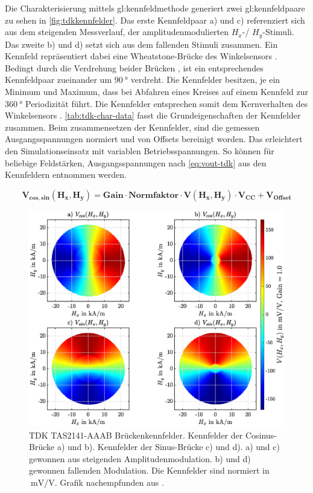 Die Charakterisierung mittels \gls{gl:kennfeldmethode} generiert zwei \gls{gl:kennfeldpaar}e zu sehen in \autoref{fig:tdkkennfelder}. Das erste Kennfeldpaar a) und c) referenziert sich aus dem steigenden Messverlauf, der amplitudenmodulierten $H_x$-/ $H_y$-Stimuli. Das zweite b) und d) setzt sich aus dem fallenden Stimuli zusammen. Ein Kennfeld repräsentiert dabei eine Wheatstone-Brücke des Winkelsensors \cite{Schuethe2019}. Bedingt durch die Verdrehung beider Brücken \cite{TDK2016}, ist ein entsprechendes Kennfeldpaar zueinander um $\SI{90}{\degree}$ verdreht.
Die Kennfelder besitzen, je ein Minimum und Maximum, dass bei Abfahren eines Kreises auf einem Kennfeld zur 
$\SI{360}{\degree}$ Periodizität führt. Die Kennfelder entsprechen somit dem Kernverhalten des Winkelsensors 
\cite{TDK2016}. \autoref{tab:tdk-char-data} fasst die Grundeigenschaften der Kennfelder zusammen. Beim zusammensetzen 
der Kennfelder, sind die gemessen Ausgangsspannungen normiert und von Offsets bereinigt worden. Das erleichtert den 
Simulationseinsatz mit variablen Betriebsspannungen. So können für beliebige Feldstärken, Ausgangsspannungen nach 
\autoref{eq:vout-tdk} aus den Kennfeldern entnommen werden.


\begin{equation}\label{eq:vout-tdk}
	\mathbf{V_{cos,sin}(H_x,H_y) = Gain \cdot Normfaktor \cdot V(H_x,H_y) \cdot V_{CC} + V_{Offset}}
\end{equation}


\begin{figure}[bph]
	\centering
	\includegraphics[width=.95\linewidth]{appendix/images/3-TDK/TDK_Kennfelder}
	\caption[TDK TAS2141-AAAB Brückenkennfelder]{TDK TAS2141-AAAB Brückenkennfelder. Kennfelder der Cosinus-Brücke a) 
		und b). Kennfelder der Sinus-Brücke c) und d). a) und c) gewonnen aus steigenden Amplitudenmodulation. b) und 
		d) gewonnen fallenden Modulation. Die Kennfelder sind normiert in $\SI{}{\milli\volt\per\volt}$. Grafik 
		nachempfunden 
		aus \cite{Schuethe2019}.}
	\label{fig:tdkkennfelder}
\end{figure}


